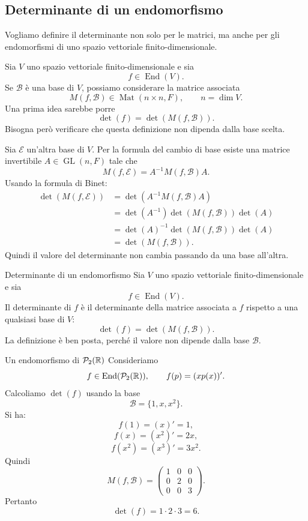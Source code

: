 \documentclass[a4paper]{article}
\begin{document}
\subsection{Determinante di un endomorfismo}

Vogliamo definire il determinante non solo per le matrici, ma anche per gli endomorfismi di uno spazio vettoriale finito-dimensionale.

Sia \(V\) uno spazio vettoriale finito-dimensionale e sia
\[
    f\in\operatorname{End}(V).
\]
Se \(\mathcal{B}\) è una base di \(V\), possiamo considerare la matrice associata
\[
    M(f,\mathcal{B})\in\operatorname{Mat}(n\times n,F),
    \qquad
    n=\dim V.
\]
Una prima idea sarebbe porre
\[
    \det(f)=\det(M(f,\mathcal{B})).
\]
Bisogna però verificare che questa definizione non dipenda dalla base scelta.

Sia \(\mathcal{E}\) un'altra base di \(V\). Per la formula del cambio di base esiste una matrice invertibile \(A\in\operatorname{GL}(n,F)\) tale che
\[
    M(f,\mathcal{E})=A^{-1}M(f,\mathcal{B})A.
\]
Usando la formula di Binet:
\begin{align*}
    \det(M(f,\mathcal{E}))
    &=
    \det(A^{-1}M(f,\mathcal{B})A)\\
    &=
    \det(A^{-1})\det(M(f,\mathcal{B}))\det(A)\\
    &=
    \det(A)^{-1}\det(M(f,\mathcal{B}))\det(A)\\
    &=
    \det(M(f,\mathcal{B})).
\end{align*}
Quindi il valore del determinante non cambia passando da una base all'altra.

\begin{snippetdefinition}{Determinante di un endomorfismo}
    Sia \(V\) uno spazio vettoriale finito-dimensionale e sia
    \[
        f\in\operatorname{End}(V).
    \]
    Il determinante di \(f\) è il determinante della matrice associata a \(f\) rispetto a una qualsiasi base di \(V\):
    \[
        \det(f)=\det(M(f,\mathcal{B})).
    \]
    La definizione è ben posta, perché il valore non dipende dalla base \(\mathcal{B}\).
\end{snippetdefinition}

\begin{snippetexample}{Un endomorfismo di \(\mathcal{P}_2(\mathbb{R})\)}
    Consideriamo
    \[
        f\in\operatorname{End}(\mathcal{P}_2(\mathbb{R})),
        \qquad
        f(p)=(xp(x))'.
    \]
    Calcoliamo \(\det(f)\) usando la base
    \[
        \mathcal{B}=\{1,x,x^2\}.
    \]
    Si ha:
    \[
        f(1)=(x)'=1,
    \]
    \[
        f(x)=(x^2)'=2x,
    \]
    \[
        f(x^2)=(x^3)'=3x^2.
    \]
    Quindi
    \[
        M(f,\mathcal{B})
        =
        \begin{pmatrix}
            1 & 0 & 0\\
            0 & 2 & 0\\
            0 & 0 & 3
        \end{pmatrix}.
    \]
    Pertanto
    \[
        \det(f)=1\cdot 2\cdot 3=6.
    \]
\end{snippetexample}
\end{document}
